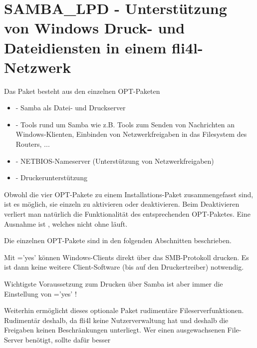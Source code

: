 \section{SAMBA\_LPD - Unterstützung von Windows Druck- und Dateidiensten in einem fli4l-Netzwerk}

Das Paket  besteht aus den einzelnen OPT-Paketen

\begin{itemize}
\item {} - Samba als Datei- und Druckserver
\item {} - Tools rund um Samba wie
  z.B. Tools zum Senden von Nachrichten an Windows-Klienten, Einbinden
  von Netzwerkfreigaben in das Filesystem des Routers, ...
\item {} - NETBIOS-Nameserver (Unterstützung von Netzwerkfreigaben)
\item {} - Druckerunterstützung
\end{itemize}

Obwohl die vier OPT-Pakete zu einem Installations-Paket zusammengefasst sind,
ist es möglich, sie einzeln zu aktivieren oder deaktivieren. Beim Deaktivieren
verliert man natürlich die Funktionalität des entsprechenden OPT-Paketes.
Eine Ausnahme ist , welches nicht ohne  läuft.




Die einzelnen OPT-Pakete sind in den folgenden Abschnitten
beschrieben.



    Mit ='yes' können Windows-Clients direkt über das SMB-Protokoll
    drucken. Es ist dann keine weitere Client-Software (bis auf den
    Druckertreiber) notwendig.

    Wichtigste Voraussetzung zum Drucken über Samba ist aber immer die
    Einstellung von ='yes' !

    Weiterhin ermöglicht dieses optionale Paket rudimentäre
    Fileserverfunktionen.
    Rudimentär deshalb, da fli4l keine Nutzerverwaltung hat und deshalb die
    Freigaben keinen Beschränkungen unterliegt. Wer einen ausgewachsenen
    File-Server benötigt, sollte dafür besser

